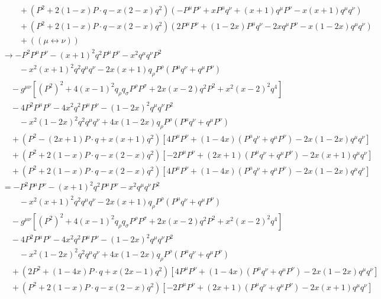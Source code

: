 \begin{align*}
  &\qquad + (P^2 + 2(1-x) P \cdot q - x(2-x) q^2)
  (-P^\mu P^\nu + x P^\mu q^\nu + (x+1) q^\mu P^\nu - x(x+1) q^\mu q^\nu) \\
  &\qquad + (P^2 + 2(1-x) P \cdot q - x(2-x) q^2)
  (2P^\mu P^\nu + (1-2x) P^\mu q^\nu - 2x q^\mu P^\nu  - x(1-2x) q^\mu q^\nu) \\
  &\qquad + (\!( \mu\leftrightarrow\nu )\!) \\
  &\to - P^2 P^\mu P^\nu - (x+1)^2 q^2 P^\mu P^\nu - x^2 q^\mu q^\nu P^2 \\
  &\qquad - x^2(x+1)^2 q^2 q^\mu q^\nu - 2x(x+1) q_\rho P^\rho (P^\mu q^\nu + q^\mu P^\nu) \\
  &\quad - g^{\mu\nu} \left[ (P^2)^2 + 4(x-1)^2 q_\rho q_\sigma P^\rho P^\sigma + 2x(x-2) q^2 P^2 + x^2(x-2)^2 q^4 \right] \\
  &\quad - 4P^2 P^\mu P^\nu - 4x^2 q^2 P^\mu P^\nu - (1-2x)^2 q^\mu q^\nu P^2 \\
  &\qquad - x^2 (1-2x)^2 q^2 q^\mu q^\nu + 4x(1-2x) q_\rho P^\rho (P^\mu q^\nu + q^\mu P^\nu) \\
  &\quad + (P^2 - (2x+1) P \cdot q + x(x+1) q^2)
  [4P^\mu P^\nu + (1-4x) (P^\mu q^\nu + q^\mu P^\nu) - 2x(1-2x) q^\mu q^\nu] \\
  &\quad + (P^2 + 2(1-x) P \cdot q - x(2-x) q^2)
  [-2P^\mu P^\nu + (2x+1) (P^\mu q^\nu + q^\mu P^\nu) - 2x(x+1) q^\mu q^\nu] \\
  &\quad + (P^2 + 2(1-x) P \cdot q - x(2-x) q^2)
  [4P^\mu P^\nu + (1-4x) (P^\mu q^\nu + q^\mu P^\nu) - 2x(1-2x) q^\mu q^\nu] \\
  &= - P^2 P^\mu P^\nu - (x+1)^2 q^2 P^\mu P^\nu - x^2 q^\mu q^\nu P^2 \\
  &\qquad - x^2(x+1)^2 q^2 q^\mu q^\nu - 2x(x+1) q_\rho P^\rho (P^\mu q^\nu + q^\mu P^\nu) \\
  &\quad - g^{\mu\nu} \left[ (P^2)^2 + 4(x-1)^2 q_\rho q_\sigma P^\rho P^\sigma + 2x(x-2) q^2 P^2 + x^2(x-2)^2 q^4 \right] \\
  &\quad - 4P^2 P^\mu P^\nu - 4x^2 q^2 P^\mu P^\nu - (1-2x)^2 q^\mu q^\nu P^2 \\
  &\qquad - x^2 (1-2x)^2 q^2 q^\mu q^\nu + 4x(1-2x) q_\rho P^\rho (P^\mu q^\nu + q^\mu P^\nu) \\
  &\quad + (2P^2 + (1 - 4x) P \cdot q + x(2x-1) q^2)
  [4P^\mu P^\nu + (1-4x) (P^\mu q^\nu + q^\mu P^\nu) - 2x(1-2x) q^\mu q^\nu] \\
  &\quad + (P^2 + 2(1-x) P \cdot q - x(2-x) q^2)
  [-2P^\mu P^\nu + (2x+1) (P^\mu q^\nu + q^\mu P^\nu) - 2x(x+1) q^\mu q^\nu] \\

\end{align*}

